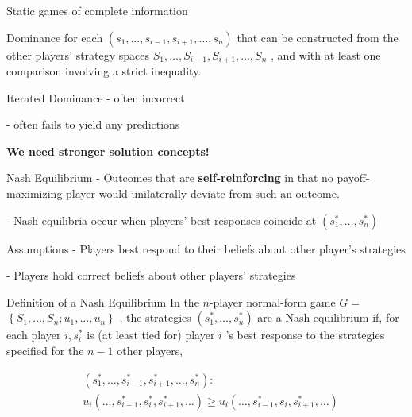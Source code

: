 \begin{titleboxchi}{Static games of complete information}
\begin{definition}{Dominance}
        for each $\left(s_{1}, \ldots, s_{i-1}, s_{i+1}, \ldots, s_{n}\right)$
        that can be constructed from the other players' strategy spaces $S_{1}, \ldots, S_{i-1}, S_{i+1}, \ldots, S_{n}$
        , and with at least one comparison involving a strict inequality.
    
    \end{definition}
    
    \begin{definition}{Iterated Dominance}
        - often incorrect
        
        - often fails to yield any predictions
        
        \textbf{We need stronger solution concepts!}
    \end{definition}
    
    \begin{concept}{Nash Equilibrium}
        - Outcomes that are \textbf{self-reinforcing}
        in that no payoff-maximizing player would unilaterally deviate from such
        an outcome.
        
        - Nash equilibria occur when players' best responses coincide at $\left(s_{1}^{*}, \ldots, s_{n}^{*}\right)$
        
        \begin{assumption}{Assumptions}
            - Players best respond to their beliefs about other player's strategies
            
            - Players hold correct beliefs about other players' strategies
        \end{assumption}
        
        \begin{definition}{Definition of a Nash Equilibrium}
            In the $n$-player normal-form game $G=$ $\left\{S_{1}, \ldots, S_{n} ; u_{1}, \ldots, u_{n}\right\}$
            , the strategies $\left(s_{1}^{*}, \ldots, s_{n}^{*}\right)$ are a Nash equilibrium if, for each player
            $i, s_{i}^{*}$ is (at least tied for) player $i$ 's best response to the strategies specified for the $n-1$
            other players,
            
            \[
                \begin{aligned}
                    & \left(s_{1}^{*}, \ldots, s_{i-1}^{*}, s_{i+1}^{*}, \ldots, s_{n}^{*}\right): \\
                    & u_{i}\left(\ldots, s_{i-1}^{*}, s_{i}^{*}, s_{i+1}^{*}, \ldots\right) \geq u_{i}
                    \left(\ldots, s_{i-1}^{*}, s_{i}, s_{i+1}^{*}, \ldots\right)
                \end{aligned}
            \]
            

\end{definition}
\end{concept}
\end{titleboxchi}
